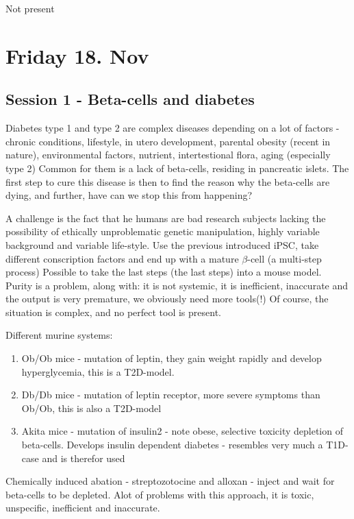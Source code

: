 \documentclass[12p]{article}
\begin{document}
Not present

\section*{Friday 18. Nov}

\subsection*{Session 1 - Beta-cells and diabetes}

Diabetes type 1 and type 2 are complex diseases depending on a lot of factors - chronic conditions, lifestyle, in utero development, parental obesity (recent in nature), environmental factors, nutrient, intertestional flora, aging (especially type 2)
Common for them is a lack of beta-cells, residing in pancreatic islets.
The first step to cure this disease is then to find the reason why the beta-cells are dying, and further, have can we stop this from happening?

A challenge is the fact that he humans are bad research subjects lacking the possibility of ethically unproblematic genetic manipulation, highly variable background and variable life-style.
Use the previous introduced  iPSC, take different conscription factors and end up with a mature $\beta$-cell (a multi-step process)
Possible to take the last steps (the last steps) into a mouse model.
Purity is a problem, along with: it is not systemic, it is inefficient, inaccurate and the output is very premature, we obviously need more tools(!)
Of course, the situation is complex, and no perfect tool is present.

Different murine systems:

\begin{enumerate}
    \item
	Ob/Ob mice - mutation of leptin, they gain weight rapidly and develop hyperglycemia, this is a T2D-model.
   \item
	Db/Db mice - mutation of leptin receptor, more severe symptoms than Ob/Ob, this is also a T2D-model
    \item
	Akita mice - mutation of insulin2 - note obese, selective toxicity depletion of beta-cells. Develops insulin dependent diabetes - resembles very much a T1D-case and is therefor used 
\end{enumerate}

Chemically induced abation - streptozotocine and alloxan - inject and wait for beta-cells to be depleted.
Alot of problems with this approach, it is toxic, unspecific, inefficient and inaccurate.
\end{document}
